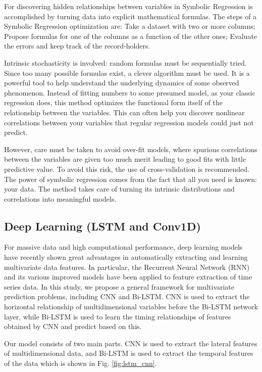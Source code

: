 For discovering hidden relationships between variables in Symbolic Regression is accomplished by turning data into explicit mathematical formulas.
The steps of a Symbolic Regression optimization are:
	Take a dataset with two or more columns;
	Propose formulas for one of the columns as a function of the other ones;
	Evaluate the errors and keep track of the record-holders.

Intrinsic stochasticity is involved: random formulas must be sequentially tried. Since too many possible formulas exist, a clever algorithm must be used.
It is a powerful tool to help understand the underlying dynamics of some observed phenomenon.
Instead of fitting numbers to some presumed model, as your classic regression does, this method optimizes the functional form itself of the relationship between the variables.
This can often help you discover nonlinear correlations between your variables that regular regression models could just not predict.

However, care must be taken to avoid over-fit models, where spurious correlations between the variables are given too much merit leading to good fits with little predictive value. To avoid this risk, the use of cross-validation is recommended.
The power of symbolic regression comes from the fact that all you need is known: your data. The method takes care of turning its intrinsic distributions and correlations into meaningful models.

\subsection{Deep Learning (\ac{LSTM}  and Conv1D)}  
For massive data and high computational performance, deep learning models have recently shown great advantages in automatically extracting and learning multivariate data features. In particular, the Recurrent Neural Network (RNN) and its various improved models have been applied to feature extraction of time series data. In this study, we propose a general framework for multivariate prediction problems, including \ac{CNN} and Bi-\ac{LSTM}. CNN is used to extract the horizontal relationship of multidimensional variables before the Bi-LSTM network layer, while Bi-LSTM is used to learn the timing relationships of features obtained by CNN and predict based on this.

Our model consists of two main parts. CNN is used to extract the lateral features of multidimensional data, and Bi-LSTM is used to extract the temporal features of the data which is shown in Fig. \ref{fig:lstm_cnn}.

